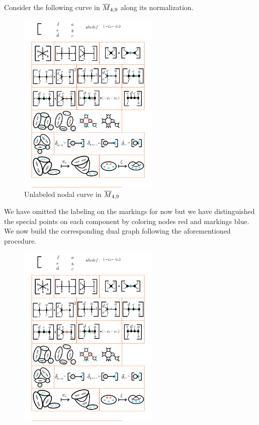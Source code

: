 \documentclass[12pt]{memoir}
\begin{document}
\begin{Ex}\label{ex-random-curve-ovM49}
    Consider the following curve in $\overline M_{4,9}$ along its normalization.
    \begin{figure}[h!]
        \centering
        \includegraphics[width=0.6\textwidth, trim= 1.32cm 9.5cm 12.7cm 15.4cm,clip]{../figs/FigsDNnotability1.pdf}
        \caption{Unlabeled nodal curve in $\overline M_{4,9}$}
        \label{fig:unlabled-random-curve-ovM49}
    \end{figure}
    We have omitted the labeling on the markings for now but we have distinguished the special points on each component by coloring nodes red and markings blue. We now build the corresponding dual graph following the aforementioned procedure.
    \begin{figure}[h!]
        \centering
        \includegraphics[width=0.6\textwidth, trim= 9.3cm 9.9cm 5.45cm 15.9cm,clip]{../figs/FigsDNnotability1.pdf}

\end{figure}
\end{Ex}
\end{document}
